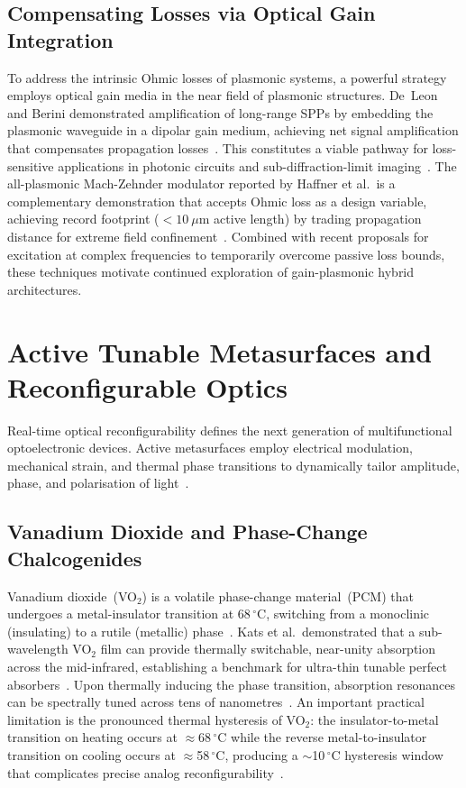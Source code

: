 \documentclass[twocolumn,10pt]{article}
\begin{document}
\subsection{Compensating Losses via Optical Gain Integration}

To address the intrinsic Ohmic losses of plasmonic systems, a powerful
strategy employs optical gain media in the near field of plasmonic
structures.  De~Leon and Berini demonstrated amplification of
long-range SPPs by embedding the plasmonic waveguide in a dipolar gain
medium, achieving net signal amplification that compensates propagation
losses~\cite{deleon2010amplification}.  This constitutes a viable
pathway for loss-sensitive applications in photonic circuits and
sub-diffraction-limit imaging~\cite{deleon2010amplification}.  The
all-plasmonic Mach-Zehnder modulator reported by Haffner et al.\ is a
complementary demonstration that accepts Ohmic loss as a design
variable, achieving record footprint ($<10~\mu$m active length) by
trading propagation distance for extreme field
confinement~\cite{haffner2015allplasmonic}.  Combined with recent
proposals for excitation at complex frequencies to temporarily overcome
passive loss bounds, these techniques motivate continued exploration of
gain-plasmonic hybrid architectures.

\section{Active Tunable Metasurfaces and Reconfigurable Optics}
\label{sec:metasurfaces}

Real-time optical reconfigurability defines the next generation of
multifunctional optoelectronic devices.  Active metasurfaces employ
electrical modulation, mechanical strain, and thermal phase transitions
to dynamically tailor amplitude, phase, and polarisation of
light~\cite{chen2016metasurface,wang2016optically,shaltout2019spatiotemporal}.

\subsection{Vanadium Dioxide and Phase-Change Chalcogenides}

Vanadium dioxide~(VO$_2$) is a volatile phase-change material~(PCM) that
undergoes a metal-insulator transition at 68\,$^\circ$C, switching from a
monoclinic (insulating) to a rutile (metallic)
phase~\cite{chen2016metasurface,kats2012ultraa}.  Kats et al.~demonstrated
that a sub-wavelength VO$_2$ film can provide thermally switchable, near-unity
absorption across the mid-infrared, establishing a benchmark for
ultra-thin tunable perfect absorbers~\cite{kats2012ultraa}.  Upon
thermally inducing the phase transition, absorption resonances can be
spectrally tuned across tens of nanometres~\cite{kats2012ultraa}.  An
important practical limitation is the pronounced thermal hysteresis of
VO$_2$: the insulator-to-metal transition on heating occurs at
$\approx$68\,$^\circ$C while the reverse metal-to-insulator transition
on cooling occurs at $\approx$58\,$^\circ$C, producing a
$\sim$10\,$^\circ$C hysteresis window that complicates precise analog
reconfigurability~\cite{chen2016metasurface}.
\end{document}
